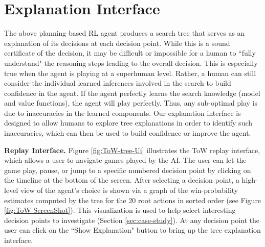 \documentclass{article}
\begin{document}

\section{Explanation Interface}
\label{sec:interface}

The above planning-based RL agent produces a search tree that serves as an explanation of its decisions at each decision point. While this is a sound certificate of the decision, it may be difficult or impossible for a human to ``fully understand" the reasoning steps leading to the overall decision. This is especially true when the agent is playing at a superhuman level. Rather, a human can still consider the individual learned inferences involved in the search to build confidence in the agent. If the agent perfectly learns the search knowledge (model and value functions), the agent will play perfectly. Thus, any sub-optimal play is due to inaccuracies in the learned components. Our explanation interface is designed to allow humans to explore tree explanations in order to identify such inaccuracies, which can then be used to build confidence or improve the agent. 


{\bf Replay Interface.} Figure \ref{fig:ToW-tree-Ui} illustrates the ToW replay interface, which allows a user to navigate games played by the AI. The user can let the game play, pause, or jump to a specific numbered decision point by clicking on the timeline at the bottom of the screen. After selecting a decision point, a high-level view of the agent's choice is shown via a graph of the win-probability estimates computed by the tree for the 20 root actions in sorted order (see Figure \ref{fig:ToW-ScreenShot}). This visualization is used to help select interesting decision points to investigate (Section \ref{sec:case-study}). At any decision point the user can click on the ``Show Explanation" button to bring up the tree explanation interface. 
\end{document}
